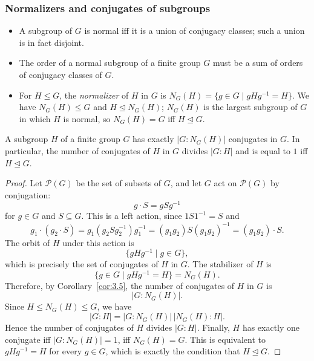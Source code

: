 \documentclass[../Odyssey_Project.tex]{subfiles}
\begin{document}
\subsubsection*{Normalizers and conjugates of subgroups}
\begin{itemize}
    \item A subgroup of $G$ is normal iff it is a union of conjugacy classes; such a union is in fact disjoint.
    \item The order of a normal subgroup of a finite group $G$ must be a sum of orders of conjugacy classes of $G$.
    \item For $H \leq G$, the \emph{normalizer} of $H$ in $G$ is $N_G(H) = \{g \in G \mid gHg^{-1} = H\}$. We have $N_G(H) \leq G$ and $H \trianglelefteq N_G(H)$; $N_G(H)$ is the largest subgroup of $G$ in which $H$ is normal, so $N_G(H) = G$ iff $H \trianglelefteq G$.
\end{itemize}

\begin{proposition}
\label{prop:3.14}
A subgroup $H$ of a finite group $G$ has exactly $|G : N_G(H)|$ conjugates in $G$. In particular, the number of conjugates of $H$ in $G$ divides $|G : H|$ and is equal to $1$ iff $H \trianglelefteq G$.
\end{proposition}

\begin{proof}
    Let $\mathcal{P}(G)$ be the set of subsets of $G$, and let $G$ act on $\mathcal{P}(G)$ by conjugation:
    \[
        g \cdot S = gSg^{-1}
    \]
    for $g \in G$ and $S \subseteq G$. This is a left action, since $1S1^{-1} = S$ and
    \[
        g_1 \cdot (g_2 \cdot S)
        = g_1(g_2Sg_2^{-1})g_1^{-1}
        = (g_1g_2)S(g_1g_2)^{-1}
        = (g_1g_2)\cdot S.
    \]
    The orbit of $H$ under this action is
    \[
        \{gHg^{-1} \mid g \in G\},
    \]
    which is precisely the set of conjugates of $H$ in $G$. The stabilizer of $H$ is
    \[
        \{g \in G \mid gHg^{-1} = H\} = N_G(H).
    \]
    Therefore, by Corollary~\ref{cor:3.5}, the number of conjugates of $H$ in $G$ is
    \[
        |G : N_G(H)|.
    \]
    Since $H \leq N_G(H) \leq G$, we have
    \[
        |G : H| = |G : N_G(H)|\,|N_G(H) : H|.
    \]
    Hence the number of conjugates of $H$ divides $|G : H|$.
    Finally, $H$ has exactly one conjugate iff $|G : N_G(H)| = 1$, iff $N_G(H)=G$. This is equivalent to $gHg^{-1}=H$ for every $g \in G$, which is exactly the condition that $H \trianglelefteq G$.
\end{proof}
\end{document}
